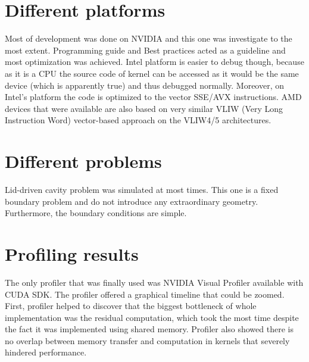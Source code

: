 \section{Different platforms}
Most of development was done on NVIDIA and this one was investigate to the most extent. Programming guide and Best practices acted as a guideline and most optimization was achieved. Intel platform is easier to debug though, because as it is a CPU the source code of kernel can be accessed as it would be the same device (which is apparently true) and thus debugged normally. Moreover, on Intel's platform the code is optimized to the vector SSE/AVX instructions. AMD devices that were available are also based on very similar VLIW (Very Long Instruction Word) vector-based approach on the VLIW4/5 architectures.

\section{Different problems}
Lid-driven cavity problem was simulated at most times. This one is a fixed boundary problem and do not introduce any extraordinary geometry. Furthermore, the boundary conditions are simple.

\section{Profiling results}
The only profiler that was finally used was NVIDIA Visual Profiler available with CUDA SDK. The profiler offered a graphical timeline that could be zoomed. First, profiler helped to discover that the biggest bottleneck of whole implementation was the residual computation, which took the most time despite the fact it was implemented using shared memory. Profiler also showed there is no overlap between memory transfer and computation in kernels that severely hindered performance.